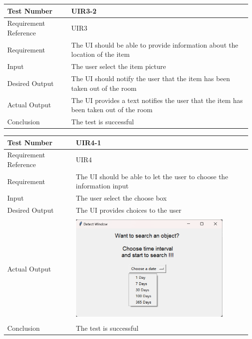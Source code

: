 \documentclass[12pt, titlepage]{article}
\begin{document}
\begin{table}[H]
\begin{center}
\begin{tabular}{|l | m{9cm}|}
\hline
  Test Number & UIR3-2\\
  \hline
  Requirement Reference & UIR3\\
  \hline
  Requirement & The UI should be able to provide information about the location of the item \\
  \hline
  Input & The user select the item picture\\
  \hline
  Desired Output & The UI should notify the user that the item has been taken out of the room\\
  \hline
  Actual Output & The UI provides a text notifies the user that the item has been taken out of the room\\
  \hline
  Conclusion & The test is successful\\
  \hline
\end{tabular}
\end{center}           
\end{table}


\begin{table}[H]
\begin{center}
\begin{tabular}{|l | m{9cm}|}
\hline
  Test Number & UIR4-1\\
  \hline
  Requirement Reference & UIR4\\
  \hline
  Requirement & The UI should be able to let the user to choose the information input\\
  \hline
  Input & The user select the choose box\\
  \hline
  Desired Output & The UI provides choices to the user\\
  \hline
  Actual Output & \includegraphics[width=80mm, height=55mm]{UIR41.png}\\
  \hline
  Conclusion & The test is successful\\
  \hline
\end{tabular}
\end{center}           
\end{table}
\end{document}
